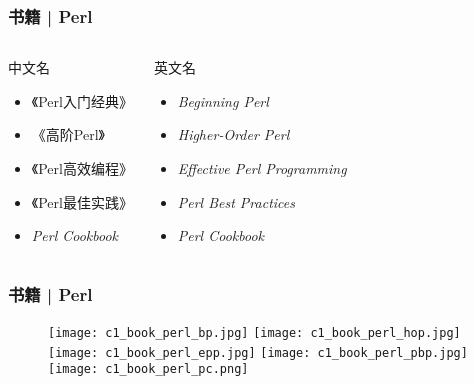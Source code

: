 \begin{frame}
  \frametitle{书籍 | Perl}
  \begin{columns}
  \begin{block}{中文名}
    \begin{itemize}
      \item 《Perl入门经典》
      \item 《高阶Perl》
      \item 《Perl高效编程》
      \item 《Perl最佳实践》
      \item \textit{Perl Cookbook}
    \end{itemize}
  \end{block}
  \begin{block}{英文名}
    \begin{itemize}
      \item \textit{Beginning Perl}
      \item \textit{Higher-Order Perl}
      \item \textit{Effective Perl Programming}
      \item \textit{Perl Best Practices}
      \item \textit{Perl Cookbook}
    \end{itemize}
  \end{block}
\end{columns}
\end{frame}

\begin{frame}
  \frametitle{书籍 | Perl}
  \begin{figure}
    \centering
    \texttt{[image: c1\_book\_perl\_bp.jpg]}\qquad
    \texttt{[image: c1\_book\_perl\_hop.jpg]}\\
    \texttt{[image: c1\_book\_perl\_epp.jpg]}\quad
    \texttt{[image: c1\_book\_perl\_pbp.jpg]}\quad
    \texttt{[image: c1\_book\_perl\_pc.png]}
  \end{figure}
\end{frame}

